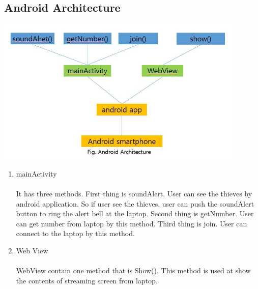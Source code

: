 \documentclass[12pt]{article}
\begin{document}
\subsection*{Android Architecture}
\begin{center} 
\includegraphics[width=120mm,scale=1.8]{androidarchitecture}
\end{center}
\begin{enumerate}
\item mainActivity\\
\\
It has three methods. First thing is soundAlert. User can see the thieves by android application. So if user see the thieves, user can push the soundAlert button to ring the alert bell at the laptop. Second thing is getNumber. User can get number from laptop by this method. Third thing is join. User can connect to the laptop by this method.\\

\item Web View\\
\\
WebView contain one method that is Show(). This method is used at show the contents of streaming screen from laptop.\\
\end{enumerate}
\end{document}
